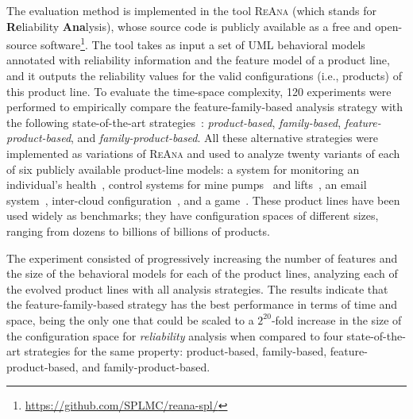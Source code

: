 
 The evaluation method is implemented in the tool
\textsc{ReAna} (which stands for \textbf{Re}liability \textbf{Ana}lysis), whose
source code is publicly available as a free and open-source
software\footnote{\url{https://github.com/SPLMC/reana-spl/}}.  The tool takes as
input a set of UML behavioral models annotated with reliability information and
the feature model of a product line, and it outputs the reliability values for the
valid configurations (i.e., products) of this product line.  
To evaluate the time-space complexity, 120 experiments were performed to
empirically compare the feature-family-based analysis strategy with the
following state-of-the-art strategies~\cite{thum_classification_2014}:
\emph{product-based}, \emph{family-based}, \emph{feature-product-based}, and
\emph{fam\-i\-ly-prod\-uct-based}. All these alternative strategies were
implemented as variations of \textsc{ReAna} and used to analyze twenty
variants of each of six publicly available product-line models: a system for
monitoring an individual's health~\cite{rodrigues_modeling_2015}, control
systems for mine pumps~\cite{kramer_conic:_1983} and
lifts~\cite{plath_feature_2001}, an email system~\cite{spl2go}, inter-cloud
configuration~\cite{ferreira_leite_automating_2015}, and a game~\cite{spl2go}.
These product lines have been used widely as benchmarks; they have configuration
spaces of different sizes, ranging from dozens to billions of billions of
products. 

The experiment consisted of progressively increasing the number of features and
the size of the behavioral models for each of the product lines, analyzing each
of the evolved product lines with all analysis strategies.  The results indicate
that the feature-family-based strategy has the best performance in terms of time
and space, being the only one that could be scaled to a $2^{20}$-fold increase
in the size of the configuration space for \textit{reliability} analysis when
compared to four state-of-the-art strategies for the same property:
product-based, family-based, feature-product-based, and
fam\-i\-ly-prod\-uct-based.


